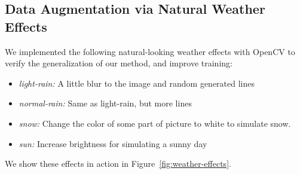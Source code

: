 \subsection{Data Augmentation via Natural Weather Effects}
We implemented the following natural-looking weather effects with OpenCV to
verify the generalization of our method, and improve training:
\begin{itemize}
    \item \emph{light-rain:} A little blur to the image and random generated lines
    \item \emph{normal-rain:} Same as light-rain, but more lines
    \item \emph{snow:} Change the color of some part of picture to white to simulate snow.
    \item \emph{sun:} Increase brightness for simulating a sunny day
\end{itemize}

We show these effects in action in Figure~\ref{fig:weather-effects}.

